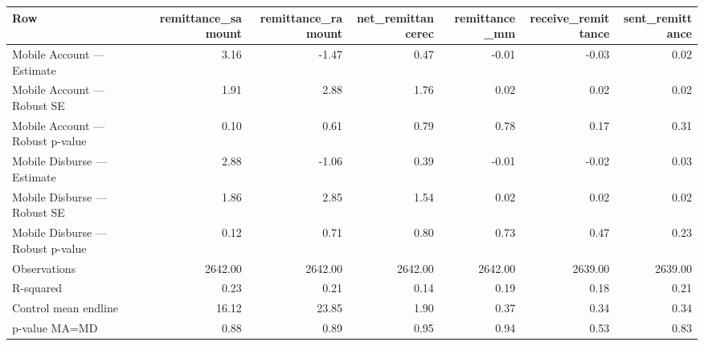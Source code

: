 
\begin{tabular}{lrrrrrr}
\toprule
Row & remittance\_samount & remittance\_ramount & net\_remittancerec & remittance\_mm & receive\_remittance & sent\_remittance\\
\midrule
Mobile Account — Estimate & 3.16 & -1.47 & 0.47 & -0.01 & -0.03 & 0.02\\
Mobile Account — Robust SE & 1.91 & 2.88 & 1.76 & 0.02 & 0.02 & 0.02\\
Mobile Account — Robust p-value & 0.10 & 0.61 & 0.79 & 0.78 & 0.17 & 0.31\\
Mobile Disburse — Estimate & 2.88 & -1.06 & 0.39 & -0.01 & -0.02 & 0.03\\
Mobile Disburse — Robust SE & 1.86 & 2.85 & 1.54 & 0.02 & 0.02 & 0.02\\
\addlinespace
Mobile Disburse — Robust p-value & 0.12 & 0.71 & 0.80 & 0.73 & 0.47 & 0.23\\
Observations & 2642.00 & 2642.00 & 2642.00 & 2642.00 & 2639.00 & 2639.00\\
R-squared & 0.23 & 0.21 & 0.14 & 0.19 & 0.18 & 0.21\\
Control mean endline & 16.12 & 23.85 & 1.90 & 0.37 & 0.34 & 0.34\\
p-value MA=MD & 0.88 & 0.89 & 0.95 & 0.94 & 0.53 & 0.83\\
\bottomrule
\end{tabular}
